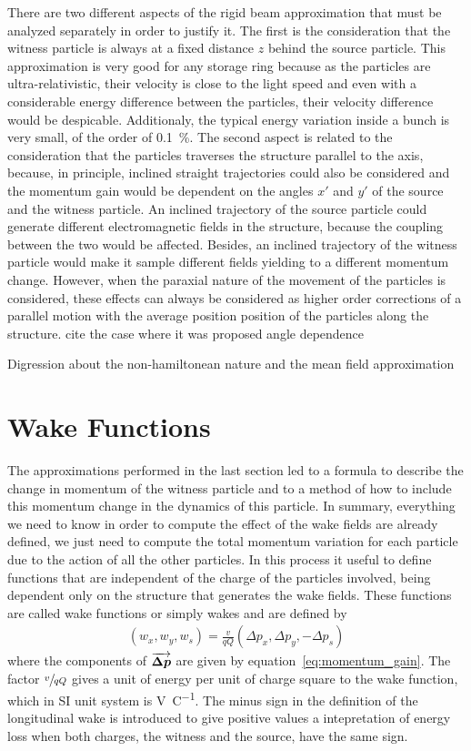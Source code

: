     There are two different aspects of the rigid beam approximation that must be analyzed separately in order to justify it. The first is the consideration that the witness particle is always at a fixed distance $z$ behind the source particle. This approximation is very good for any storage ring because as the particles are ultra-relativistic, their velocity is close to the light speed and even with a considerable energy difference between the particles, their velocity difference would be despicable. Additionaly, the typical energy variation inside a bunch is very small, of the order of \SI{0.1}{\percent}. The second aspect is related to the consideration that the particles traverses the structure parallel to the axis, because, in principle, inclined straight trajectories could also be considered and the momentum gain would be dependent on the angles $x'$ and $y'$ of the source and the witness particle. An inclined trajectory of the source particle could generate different electromagnetic fields in the structure, because the coupling between the two would be affected. Besides, an inclined trajectory of the witness particle would make it sample different fields yielding to a different momentum change. However, when the paraxial nature of the movement of the particles is considered, these effects can always be considered as higher order corrections of a parallel motion with the average position position of the particles along the structure. {\huge cite the case where it was proposed angle dependence}

    {\huge Digression about the non-hamiltonean nature and the mean field approximation}

\section{Wake Functions}\label{sec:wake_functions}

    The approximations performed in the last section led to a formula to describe the change in momentum of the witness particle and to a method of how to include this momentum change in the dynamics of this particle. In summary, everything we need to know in order to compute the effect of the wake fields are already defined, we just need to compute the total momentum variation for each particle due to the action of all the other particles. In this process it useful to define functions that are independent of the charge of the particles involved, being dependent only on the structure that generates the wake fields. These functions are called wake functions or simply wakes and are defined by
    \begin{align}\label{eq:wake_definition}
	  	\left(w_x, w_y, w_s\right) =
	  	\frac{v}{qQ} \left(\Delta p_x, \Delta p_y, -\Delta p_s\right)
    \end{align}
    where the components of $\overrightarrow{\boldsymbol{\Delta p}}$ are given by equation~\eqref{eq:momentum_gain}. The factor $\sfrac{v}{qQ}$ gives a unit of energy per unit of charge square to the wake function, which in SI unit system is \si{\volt\per\coulomb}.  The minus sign in the definition of the longitudinal wake is introduced to give positive values a intepretation of energy loss when both charges, the witness and the source, have the same sign.

